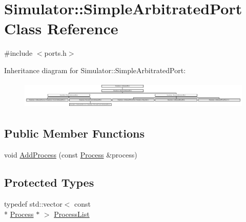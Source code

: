 \hypertarget{class_simulator_1_1_simple_arbitrated_port}{\section{Simulator\+:\+:Simple\+Arbitrated\+Port Class Reference}
\label{class_simulator_1_1_simple_arbitrated_port}
}


{\ttfamily \#include $<$ports.\+h$>$}

Inheritance diagram for Simulator\+:\+:Simple\+Arbitrated\+Port\+:\begin{figure}[H]
\begin{center}
\leavevmode
\includegraphics[height=1.346154cm]{class_simulator_1_1_simple_arbitrated_port}
\end{center}
\end{figure}
\subsection*{Public Member Functions}
\begin{DoxyCompactItemize}
\item 
void \hyperlink{class_simulator_1_1_simple_arbitrated_port_a86c872f66b65162edab88d5baee5d66b}{Add\+Process} (const \hyperlink{class_simulator_1_1_process}{Process} \&process)
\end{DoxyCompactItemize}
\subsection*{Protected Types}
\begin{DoxyCompactItemize}
\item 
typedef std\+::vector$<$ const \\*
\hyperlink{class_simulator_1_1_process}{Process} $\ast$ $>$ \hyperlink{class_simulator_1_1_simple_arbitrated_port_a279e689b99bb2c7b2b2b0605979c14de}{Process\+List}
\end{DoxyCompactItemize}
